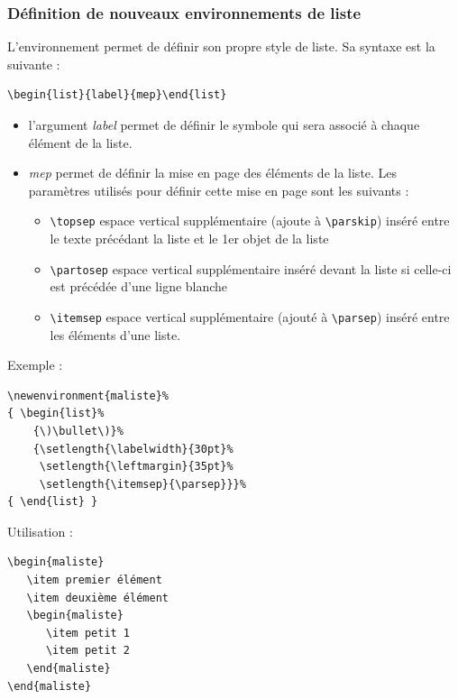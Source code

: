 \documentclass[a4paper,twoside]{article}
\begin{document}
\subsubsection{Définition de nouveaux environnements de liste}
L'environnement  permet de définir son propre style de
liste. Sa syntaxe est la suivante :
\begin{verbatim}
\begin{list}{label}{mep}\end{list}
\end{verbatim}

\begin{itemize}
\item l'argument \textit{label} permet de définir le symbole qui sera
associé à chaque élément de la liste.
\item \textit{mep} permet de définir la mise en page des éléments de la
liste. Les paramètres utilisés pour définir cette mise en page
sont les suivants :
\begin{itemize}
\item \verb|\topsep| espace vertical supplémentaire (ajoute à \verb|\parskip|) inséré entre le texte précédant la liste et le 1er objet de la liste
\item \verb|\partosep| espace vertical supplémentaire inséré devant la liste si celle-ci est précédée d'une ligne blanche
\item \verb|\itemsep| espace vertical supplémentaire (ajouté à \verb|\parsep|) inséré entre les éléments d'une liste.
\end{itemize}

\end{itemize}


Exemple :

\begin{verbatim}
\newenvironment{maliste}%
{ \begin{list}%
	{\)\bullet\)}%
	{\setlength{\labelwidth}{30pt}%
	 \setlength{\leftmargin}{35pt}%
	 \setlength{\itemsep}{\parsep}}}%
{ \end{list} }
\end{verbatim}

Utilisation :

\begin{verbatim}
\begin{maliste}
   \item premier élément
   \item deuxième élément
   \begin{maliste}
      \item petit 1
      \item petit 2
   \end{maliste}
\end{maliste}
\end{verbatim}
\end{document}
